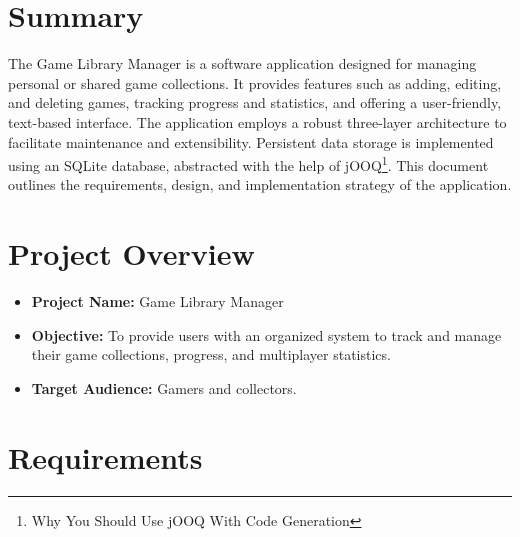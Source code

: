 \documentclass[paper=a4,fontsize=12pt,parskip=half*]{scrartcl}
\begin{document}
\newcommand{\rectangle}{\rule{0.5em}{0.5em}}

\pagestyle{plain}



\section*{Summary}

The Game Library Manager is a software application designed for managing personal or shared
game collections. It provides features such as adding, editing, and deleting games, tracking progress
and statistics, and offering a user-friendly, text-based interface. The application employs a
robust three-layer architecture to facilitate maintenance and extensibility. Persistent data storage is
implemented using an SQLite database, abstracted with the help of jOOQ\footnote{Why You Should Use jOOQ With Code Generation\cite{JOOQ}}.
This document outlines the requirements, design, and implementation strategy of the application.
\clearpage
\tableofcontents

\clearpage
{}


\section{Project Overview}
\begin{itemize}
	\item \textbf{Project Name:} Game Library Manager
	\item \textbf{Objective:} To provide users with an organized system to track and manage their game collections, progress, and multiplayer statistics.
	\item \textbf{Target Audience:} Gamers and collectors.
\end{itemize}

\section{Requirements}
\end{document}
